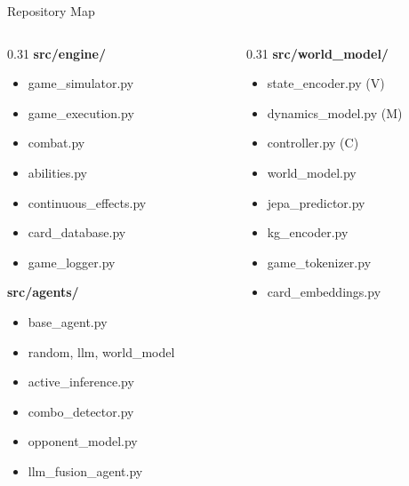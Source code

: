 \documentclass[aspectratio=169, 10pt]{beamer}
\begin{document}
\begin{frame}{Repository Map}
  \begin{columns}[T]
    \begin{column}{0.31\textwidth}
      \footnotesize
      \textbf{src/engine/}\\
      \begin{itemize}\scriptsize
        \item game\_simulator.py
        \item game\_execution.py
        \item combat.py
        \item abilities.py
        \item continuous\_effects.py
        \item card\_database.py
        \item game\_logger.py
      \end{itemize}
      \vspace{0.15cm}
      \textbf{src/agents/}\\
      \begin{itemize}\scriptsize
        \item base\_agent.py
        \item random, llm, world\_model
        \item active\_inference.py
        \item combo\_detector.py
        \item opponent\_model.py
        \item llm\_fusion\_agent.py
      \end{itemize}
    \end{column}
    \begin{column}{0.31\textwidth}
      \footnotesize
      \textbf{src/world\_model/}\\
      \begin{itemize}\scriptsize
        \item state\_encoder.py (V)
        \item dynamics\_model.py (M)
        \item controller.py (C)
        \item world\_model.py
        \item jepa\_predictor.py
        \item kg\_encoder.py
        \item game\_tokenizer.py
        \item card\_embeddings.py
      \end{itemize}

\end{column}
\end{columns}
\end{frame}
\end{document}

